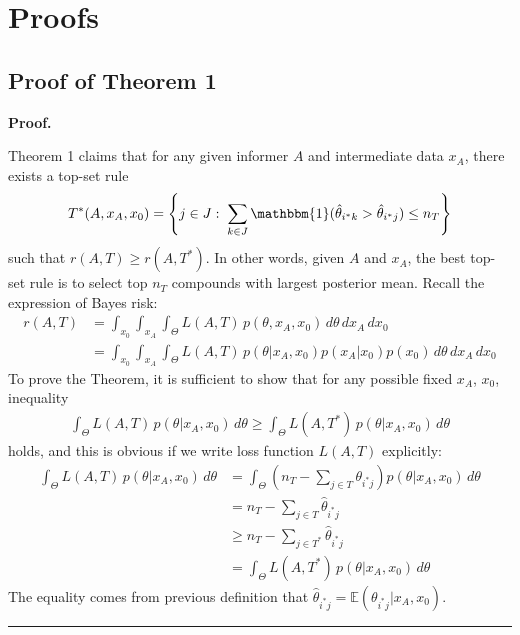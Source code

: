 \documentclass[12pt]{article}
\newenvironment{proof}[1][Proof]{\noindent\textbf{#1.} }{\ \rule{0.5em}{0.5em}}
\begin{document}
\appendix 

\section{Proofs}
\subsection{Proof of Theorem 1}
\begin{proof}

Theorem 1 claims that for any given informer $A$ and intermediate data $x_A$, there exists a top-set rule 
\begin{eqnarray*}
T^*(A,x_A,x_0) = \left\{ j \in J: \; \sum_{k\in J} \mathbbm{1}(\hat \theta_{i^*k} > \hat \theta_{i^*j}) \leq n_T \right\}
\end{eqnarray*}
such that  $r(A,T) \geq r(A, T^*)$. In other words, given $A$ and $x_A$, the best top-set rule is to select top $n_T$ compounds with largest posterior mean. Recall the expression of Bayes risk: 
\begin{align*}
r(A, T) 
&= \int_{x_0} \int_{x_A} \int_\Theta  L\left( A, T \right) \, 
p(\theta, x_A,x_0)\, d\theta \, d x_A \, d x_0\\
&= \int_{x_0} \int_{x_A} \int_\Theta  L\left( A, T \right) \, 
p(\theta |x_A,x_0)p(x_A|x_0)p(x_0)\, d\theta \, d x_A \, d x_0
\end{align*}
To prove the Theorem, it is sufficient to show that for any possible fixed $x_A$, $x_0$, inequality 
\begin{eqnarray}
\label{eq:inequal1}
\int_\Theta  L\left( A, T \right) \, 
p(\theta |x_A,x_0) \, d\theta \geq \int_\Theta  L\left( A, T^* \right) \, 
p(\theta |x_A,x_0) \, d\theta
\end{eqnarray}holds, and this is obvious if we write loss function $L(A,T)$ explicitly:
\begin{align*}
\int_\Theta  L\left( A, T \right) \, p(\theta |x_A,x_0) \, d\theta &= \int_\Theta  ( n_T - \sum_{j\in T} \theta_{i^*j}) 
p(\theta |x_A,x_0) \, d\theta\\
&= n_T - \sum_{j\in T} \hat \theta_{i^*j}\\
&\geq n_T - \sum_{j\in T^*}  \hat \theta_{i^*j}\\
&= \int_\Theta  L\left( A, T^* \right) \, 
p(\theta |x_A,x_0) \, d\theta
\end{align*}
The equality comes from previous definition that $\hat \theta_{i^*j} = \mathbb E(\theta_{i^*j}|x_A,x_0)$.
\end{proof}
\end{document}
